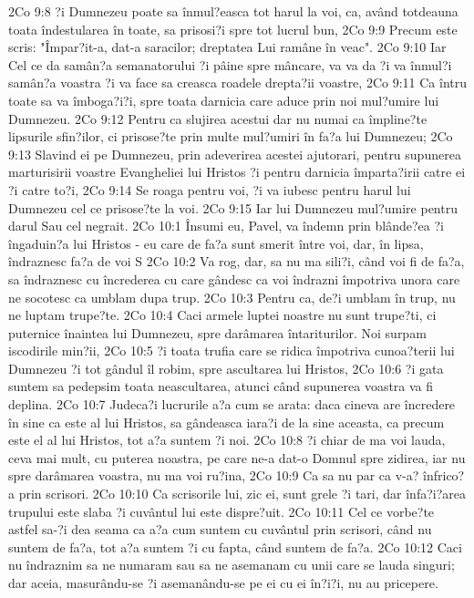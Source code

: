 2Co 9:8  ?i Dumnezeu poate sa înmul?easca tot harul la voi, ca, având totdeauna toata îndestularea în toate, sa prisosi?i spre tot lucrul bun,
2Co 9:9  Precum este scris: "Împar?it-a, dat-a saracilor; dreptatea Lui ramâne în veac".
2Co 9:10  Iar Cel ce da samân?a semanatorului ?i pâine spre mâncare, va va da ?i va înmul?i samân?a voastra ?i va face sa creasca roadele drepta?ii voastre,
2Co 9:11  Ca întru toate sa va îmboga?i?i, spre toata darnicia care aduce prin noi mul?umire lui Dumnezeu.
2Co 9:12  Pentru ca slujirea acestui dar nu numai ca împline?te lipsurile sfin?ilor, ci prisose?te prin multe mul?umiri în fa?a lui Dumnezeu;
2Co 9:13  Slavind ei pe Dumnezeu, prin adeverirea acestei ajutorari, pentru supunerea marturisirii voastre Evangheliei lui Hristos ?i pentru darnicia împarta?irii catre ei ?i catre to?i,
2Co 9:14  Se roaga pentru voi, ?i va iubesc pentru harul lui Dumnezeu cel ce prisose?te la voi.
2Co 9:15  Iar lui Dumnezeu mul?umire pentru darul Sau cel negrait.
2Co 10:1  Însumi eu, Pavel, va îndemn prin blânde?ea ?i îngaduin?a lui Hristos - eu care de fa?a sunt smerit între voi, dar, în lipsa, îndraznesc fa?a de voi S
2Co 10:2  Va rog, dar, sa nu ma sili?i, când voi fi de fa?a, sa îndraznesc cu încrederea cu care gândesc ca voi îndrazni împotriva unora care ne socotesc ca umblam dupa trup.
2Co 10:3  Pentru ca, de?i umblam în trup, nu ne luptam trupe?te.
2Co 10:4  Caci armele luptei noastre nu sunt trupe?ti, ci puternice înaintea lui Dumnezeu, spre darâmarea întariturilor. Noi surpam iscodirile min?ii,
2Co 10:5  ?i toata trufia care se ridica împotriva cunoa?terii lui Dumnezeu ?i tot gândul îl robim, spre ascultarea lui Hristos,
2Co 10:6  ?i gata suntem sa pedepsim toata neascultarea, atunci când supunerea voastra va fi deplina.
2Co 10:7  Judeca?i lucrurile a?a cum se arata: daca cineva are încredere în sine ca este al lui Hristos, sa gândeasca iara?i de la sine aceasta, ca precum este el al lui Hristos, tot a?a suntem ?i noi.
2Co 10:8  ?i chiar de ma voi lauda, ceva mai mult, cu puterea noastra, pe care ne-a dat-o Domnul spre zidirea, iar nu spre darâmarea voastra, nu ma voi ru?ina,
2Co 10:9  Ca sa nu par ca v-a? înfrico?a prin scrisori.
2Co 10:10  Ca scrisorile lui, zic ei, sunt grele ?i tari, dar înfa?i?area trupului este slaba ?i cuvântul lui este dispre?uit.
2Co 10:11  Cel ce vorbe?te astfel sa-?i dea seama ca a?a cum suntem cu cuvântul prin scrisori, când nu suntem de fa?a, tot a?a suntem ?i cu fapta, când suntem de fa?a.
2Co 10:12  Caci nu îndraznim sa ne numaram sau sa ne asemanam cu unii care se lauda singuri; dar aceia, masurându-se ?i asemanându-se pe ei cu ei în?i?i, nu au pricepere.
